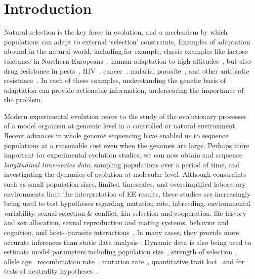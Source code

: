 \documentclass[11pt]{article}
\begin{document}
\section{Introduction}
Natural selection is the key force in evolution, and a mechanism by
which populations can adapt to external `selection'
constraints. Examples of adaptation abound in the natural world,
including for example, classic examples like lactose tolerance in
Northern Europeans~\cite{bersaglieri2004genetic}, human adaptation to high
altitudes~\cite{yi2010sequencing,simonson2010genetic}, but also drug 
resistance in
pests~\cite{daborn2001ddt}, HIV~\cite{Feder2016More},
cancer~\cite{gottesman2002mechanisms,zahreddine2013mechanisms},
malarial parasite~\cite{ariey2014molecular,nair2007recurrent}, and
other antibiotic resistance~\cite{spellberg2008epidemic}. In each of
these examples, understanding the genetic basis of adaptation can
provide actionable information, underscoring the importance of the
problem.

Modern experimental evolution refers to the study of the evolutionary
processes of a model organism at genomic level in a controlled
\cite{hegreness2006equivalence,lang2013pervasive,orozco2012adaptation,
  lang2011genetic,barrick2009genome,bollback2007clonal,oz2014strength}
or natural
\cite{maldarelli2013hiv,reid2011new,denef2012situ,winters2012development,
  daniels2013genetic,barrett2008natural,bergland2014genomic}
environment. Recent advances in whole genome sequencing have enabled
us to sequence populations at a reasonable cost even when the genomes
are large. Perhaps more important for experimental evolution studies,
we can now obtain and sequence \emph{longitudinal time-series data},
sampling populations over a period of time, and investigating the
dynamics of evolution at molecular level.  Although constraints such
as small population sizes, limited timescales, and oversimplified
laboratory environments limit the interpretation of EE results, these
studies are increasingly being used to test hypotheses regarding
mutation rate, inbreeding, environmental variability, sexual selection
\& conflict, kin selection and cooperation, life history and sex
allocation, sexual reproduction and mating systems, behavior and
cognition, and host-–parasite
interactions~\cite{kawecki2012experimental}. In many cases, they
provide more accurate inferences than static data analysis
\cite{boyko2008assessing,desai2008polymorphism,sawyer1992population}. Dynamic
data is also being used to estimate model parameters including
population
size~\cite{williamson1999using,wang2001pseudo,pollak1983new,waples1989generalized,
  Terhorst2015Multi}, strength of
selection~\cite{mathieson2013estimating,illingworth2011distinguishing,Terhorst2015Multi,
  bollback2008estimation,illingworth2012quantifying,malaspinas2012estimating,
  Steinrücken2014a}, allele age~\cite{malaspinas2012estimating}
recombination rate~\cite{Terhorst2015Multi}, mutation
rate~\cite{Barrick2013Genome, Terhorst2015Multi}, quantitative trait
loci~\cite{baldwin2014power} and for tests of neutrality
hypotheses~\cite{feder2014Identifying,Terhorst2015Multi,burke2010genome,bergland2014genomic}.
\end{document}
